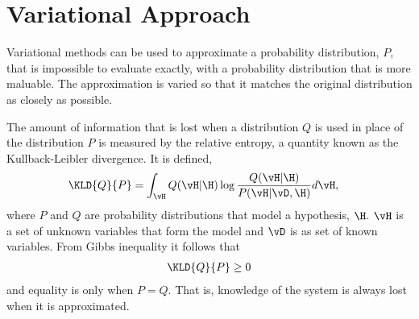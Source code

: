 {\section{Variational Approach}

Variational methods can be used to approximate a probability distribution, $P$, that is impossible to evaluate exactly, 
with a probability distribution that is more maluable.
The approximation is varied so that it matches the original distribution as closely as possible. 

The amount of information that is lost when a distribution $Q$ is used in place of the distribution $P$ is measured by the relative entropy, 
a quantity known as the  Kullback-Leibler divergence.
It is defined,
\begin{align}
\KLD{Q}{P} &= \int_\vH Q(\vH|\H) \log\frac{Q(\vH|\H)}{P(\vH|\vD,\H)} d\vH,
\end{align}
where $P$ and $Q$ are probability distributions that model a hypothesis, $\H$.
$\vH$ is a set of unknown variables that form the model and $\vD$ is as set of known variables.
From Gibbs inequality it follows that 
\begin{align}
\KLD{Q}{P} \ge 0
\end{align}
and equality is only when $P=Q$.
That is, knowledge of the system is always lost when it is approximated.

}
